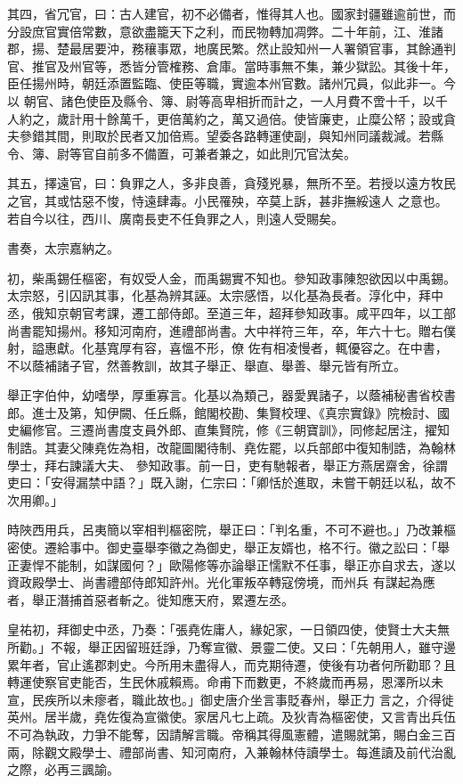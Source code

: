 \begin{pinyinscope}
 其四，省冗官，曰：古人建官，初不必備者，惟得其人也。國家封疆雖逾前世，而分設庶官實倍常數，意欲盡籠天下之利，而民物轉加凋弊。二十年前，江、淮諸郡，揚、楚最居要沖，務穰事眾，地廣民繁。然止設知州一人署領官事，其餘通判官、推官及州官等，悉皆分管榷務、倉庫。當時事無不集，兼少獄訟。其後十年，臣任揚州時，朝廷添置監臨、使臣等職，實逾本州官數。諸州冗員，似此非一。今以
 朝官、諸色使臣及縣令、簿、尉等高卑相折而計之，一人月費不啻十千，以千人約之，歲計用十餘萬千，更倍萬約之，萬又過倍。使皆廉吏，止糜公帑；設或貪夫參錯其間，則取於民者又加倍焉。望委各路轉運使副，與知州同議裁減。若縣令、簿、尉等官自前多不備置，可兼者兼之，如此則冗官汰矣。



 其五，擇遠官，曰：負罪之人，多非良善，貪殘兇暴，無所不至。若授以遠方牧民之官，其或怙惡不悛，恃遠肆毒。小民罹殃，卒莫上訴，甚非撫綏遠人
 之意也。若自今以往，西川、廣南長吏不任負罪之人，則遠人受賜矣。



 書奏，太宗嘉納之。



 初，柴禹錫任樞密，有奴受人金，而禹錫實不知也。參知政事陳恕欲因以中禹錫。太宗怒，引囚訊其事，化基為辨其誣。太宗感悟，以化基為長者。淳化中，拜中丞，俄知京朝官考課，遷工部侍郎。至道三年，超拜參知政事。咸平四年，以工部尚書罷知揚州。移知河南府，進禮部尚書。大中祥符三年，卒，年六十七。贈右僕射，謚惠獻。化基寬厚有容，喜慍不形，僚
 佐有相凌慢者，輒優容之。在中書，不以蔭補諸子官，然善教訓，故其子舉正、舉直、舉善、舉元皆有所立。



 舉正字伯仲，幼嗜學，厚重寡言。化基以為類己，器愛異諸子，以蔭補秘書省校書郎。進士及第，知伊闕、任丘縣，館閣校勘、集賢校理、《真宗實錄》院檢討、國史編修官。三遷尚書度支員外郎、直集賢院，修《三朝寶訓》，同修起居注，擢知制誥。其妻父陳堯佐為相，改龍圖閣待制、堯佐罷，以兵部郎中復知制誥，為翰林學士，拜右諫議大夫、
 參知政事。前一日，吏有馳報者，舉正方燕居齋舍，徐謂吏曰：「安得漏禁中語？」既入謝，仁宗曰：「卿恬於進取，未嘗干朝廷以私，故不次用卿。」



 時陜西用兵，呂夷簡以宰相判樞密院，舉正曰：「判名重，不可不避也。」乃改兼樞密使。遷給事中。御史臺舉李徽之為御史，舉正友婿也，格不行。徽之訟曰：「舉正妻悍不能制，如謀國何？」歐陽修等亦論舉正懦默不任事，舉正亦自求去，遂以資政殿學士、尚書禮部侍郎知許州。光化軍叛卒轉寇傍境，而州兵
 有謀起為應者，舉正潛捕首惡者斬之。徙知應天府，累遷左丞。



 皇祐初，拜御史中丞，乃奏：「張堯佐庸人，緣妃家，一日領四使，使賢士大夫無所勸。」不報，舉正因留班廷諍，乃奪宣徽、景靈二使。又曰：「先朝用人，雖守邊累年者，官止遙郡刺史。今所用未盡得人，而克期待遷，使後有功者何所勸耶？且轉運使察官吏能否，生民休戚賴焉。命甫下而數更，不終歲而再易，恩澤所以未宣，民疾所以未瘳者，職此故也。」御史唐介坐言事貶春州，舉正力
 言之，介得徙英州。居半歲，堯佐復為宣徽使。家居凡七上疏。及狄青為樞密使，又言青出兵伍不可為執政，力爭不能奪，因請解言職。帝稱其得風憲體，遣賜就第，賜白金三百兩，除觀文殿學士、禮部尚書、知河南府，入兼翰林侍讀學士。每進讀及前代治亂之際，必再三諷諭。




\end{pinyinscope}
